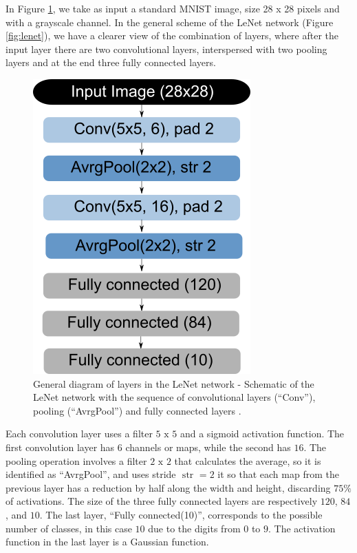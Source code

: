 In Figure \ref{fig:lenet2}, we take as input a standard MNIST image, size 28 x 28 pixels and with a grayscale channel. In the general scheme of the LeNet network (Figure \ref{fig:lenet}), we have a clearer view of the combination of layers, where after the input layer there are two convolutional layers, interspersed with two pooling layers and at the end three fully connected layers.

\begin{figure}
    \centering
    \includegraphics[scale=0.4]{images/figure126.png}
    \caption{ General diagram of layers in the LeNet network - Schematic of the LeNet network with the sequence of convolutional layers (“Conv”), pooling (“AvrgPool”) and fully connected layers \cite{zhang2020dive}.}
    \label{fig:lenet2}
\end{figure}

Each convolution layer uses a filter $5 \text{ x } 5$ and a sigmoid activation function. The first convolution layer has $6$ channels or maps, while the second has $16$. The pooling operation involves a filter $2 \text{ x } 2$ that calculates the average, so it is identified as “AvrgPool”, and uses stride $\text{ str }=2$ it so that each map from the previous layer has a reduction by half along the width and height, discarding $75\%$ of activations. The size of the three fully connected layers are respectively $120$, $84$, and $10$. The last layer, “Fully connected(10)”, corresponds to the possible number of classes, in this case $10$ due to the digits from $0$ to $9$. The activation function in the last layer is a Gaussian function.

